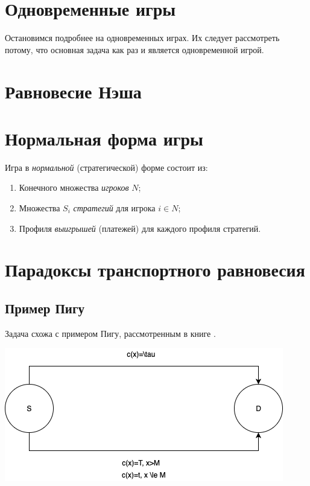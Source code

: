 \section{Одновременные игры}

Остановимся подробнее на одновременных играх. Их следует рассмотреть потому, что основная задача как раз и является одновременной игрой.




\section{Равновесие Нэша}

\section{Нормальная форма игры}
Игра в \textit{нормальной} (стратегической) форме состоит из:
\begin{enumerate}
	\item Конечного множества \textit{игроков} $N$;
	\item Множества $S_i$ \textit{стратегий} для игрока $i\in N$;
	\item Профиля \textit{выигрышей} (платежей) для каждого профиля стратегий.
\end{enumerate}\cite[221]{Association:2018aa}

\section{Парадоксы транспортного равновесия}
\subsection{Пример Пигу}\cite[447]{agt2007}
Задача схожа с примером Пигу, рассмотренным в книге \cite{agt2007}.

\includegraphics[scale=.7]{img/pigou}


